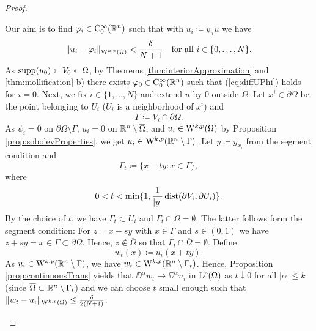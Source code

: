 \begin{proof}
\begin{enumerate}[i)]
      Our aim is to find $\varphi_i \in \mathrm{C}_0^\infty(\mathbb{R}^n)$ such that with $u_i \coloneqq \psi_i u$ we have
      \begin{equation} \label{eq:diffUPhi}
        \|u_i - \varphi_i\|_{\mathrm{W}^{k,p}(\Omega)} < \frac{\delta}{N + 1} \quad\text{for all } i \in \{0,\dots,N\}.        
      \end{equation}
      As $\operatorname{supp}(u_0) \Subset V_0 \Subset \Omega$, by Theorems \ref{thm:interiorApproximation} and \ref{thm:mollification} b) there exists $\varphi_0 \in \mathrm{C}_0^\infty(\mathbb{R}^n)$ such that (\ref{eq:diffUPhi}) holds for $i = 0$.
      Next, we fix $i \in \{ 1, \dots, N\}$ and extend $u$ by $0$ outside $\Omega$.
      Let $x^i \in \partial \Omega$ be the point belonging to $U_i$ ($U_i$ is a neighborhood of $x^i$) and 
      $$
      \Gamma \coloneqq \overline{V_i} \cap \partial\Omega.
      $$
      As $\psi_i = 0$ on $\partial \Omega \setminus \Gamma$, $u_i = 0$ on $\mathbb{R}^n \setminus \overline{\Omega}$, and $u_i \in \mathrm{W}^{k,p}(\Omega)$ by Proposition \ref{prop:sobolevProperties}, we get $u_i \in \mathrm{W}^{k,p}(\mathbb{R}^n \setminus \Gamma)$.
      Let $y \coloneqq y_{x_i}$ from the segment condition and 
      $$
      \Gamma_t \coloneqq \{ x - ty \colon x \in \Gamma \},
      $$
      where 
      $$
      0 < t < \min\{1, \frac{1}{|y|} \operatorname{dist}(\partial V_i, \partial U_i)\}.
      $$
      By the choice of $t$, we have $\Gamma_t \subset U_i$ and $\Gamma_t \cap \overline{\Omega} = \emptyset$.
      The latter follows form the segment condition: For $z = x - sy$ with $x \in \Gamma$ and $s \in (0,1)$ we have $z + sy = x \in \Gamma \subset \partial\Omega$.
      Hence, $z \not\in\overline{\Omega}$ so that $\Gamma_t \cap \overline\Omega = \emptyset$.
      Define 
      $$
      w_t(x) \coloneqq u_i(x + ty).
      $$
      As $u_i \in \mathrm{W}^{k,p}(\mathbb{R}^n \setminus \Gamma)$, we have $w_t \in \mathrm{W}^{k,p}(\mathbb{R}^n\setminus \Gamma_t)$.
      Hence, Proposition \ref{prop:continuousTrans} yields that $\DD^\alpha w_t \to \DD^\alpha u_i$ in $\mathrm{L}^p(\Omega)$ as $t \downarrow 0$ for all $|\alpha| \leq k$ (since $\overline\Omega \subset \mathbb{R}^n \setminus \Gamma_t$) and we can choose $t$ small enough such that $\|w_t - u_i \|_{\mathrm{W}^{k,p}(\Omega)} \leq \frac{\delta}{2 ( N + 1 )}$.


\end{enumerate}
\end{proof}
